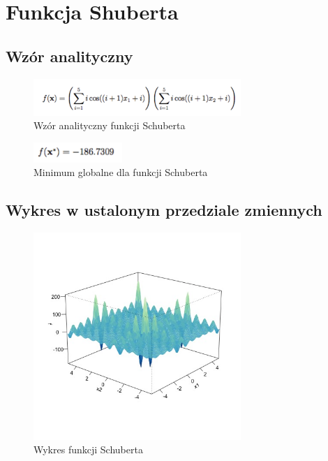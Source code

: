 \documentclass{article}
\begin{document}
\newpage
\section{Funkcja Shuberta}
	\subsection{Wzór analityczny}
	   \begin{figure}[!htbp]
    \centering
    \includegraphics[width=0.7\textwidth]{inc/wzory/schubert}
     \caption{Wzór analityczny funkcji Schuberta}
    \end{figure}
    
    
    \begin{figure}[!htbp]
    \centering
    \includegraphics[width=0.3\textwidth]{inc/wzory/schubert-global-minimum}
     \caption{Minimum globalne dla funkcji Schuberta}
    \end{figure}
    
    
    \subsection{Wykres w ustalonym przedziale zmiennych}
    
    \begin{figure}[!htbp]
    \centering
    \includegraphics[width=0.7\textwidth]{inc/wykresyfunkcji/schubert}
     \caption{Wykres  funkcji Schuberta}
    \end{figure}
    
\end{document}
